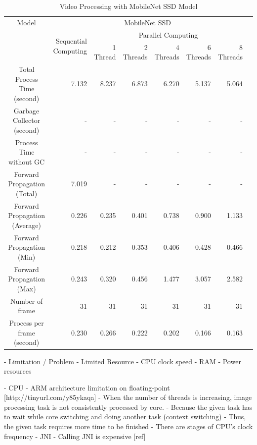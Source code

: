         \begin{table}[!htp]\centering
            \scriptsize
            \begin{tabular}{lrrrrrrrr}\toprule
                \multicolumn{2}{c}{Model} &\multicolumn{6}{c}{MobileNet SSD} \\\cmidrule{1-8}
                \multicolumn{2}{c}{\multirow{2}{*}{}} &\multirow{2}{*}{Sequential Computing} &\multicolumn{5}{c}{Parallel Computing} \\\cmidrule{4-8}
                & & &1 Thread &2 Threads &4 Threads &6 Threads &8 Threads \\\midrule
                \multicolumn{2}{c}{Total Process Time (second)} &7.132 &8.237 &6.873 &6.270 &5.137 &5.064 \\
                \multicolumn{2}{c}{Garbage Collector (second)} &- &- &- &- &- &- \\
                \multicolumn{2}{c}{Process Time without GC} &- &- &- &- &- &- \\
                \multicolumn{2}{c}{Forward Propagation (Total)} &7.019 &- &- &- &- &- \\
                \multicolumn{2}{c}{Forward Propagation (Average)} &0.226 &0.235 &0.401 &0.738 &0.900 &1.133 \\
                \multicolumn{2}{c}{Forward Propagation (Min)} &0.218 &0.212 &0.353 &0.406 &0.428 &0.466 \\
                \multicolumn{2}{c}{Forward Propagation (Max)} &0.243 &0.320 &0.456 &1.477 &3.057 &2.582 \\
                \multicolumn{2}{c}{Number of frame} &31 &31 &31 &31 &31 &31 \\
                \multicolumn{2}{c}{Process per frame (second)} &0.230 &0.266 &0.222 &0.202 &0.166 &0.163 \\
                \bottomrule
            \end{tabular}

            \caption{Video Processing with MobileNet SSD Model}\label{ssd:performance}
        \end{table}

        -	Limitation / Problem
            - Limited Resource
                - CPU clock speed
                - RAM
                - Power resources

            - CPU
                - ARM architecture limitation on floating-point [http://tinyurl.com/y85ykaqa]
                - When the number of threads is increasing, image processing task is not consistently processed by core.
                    - Because the given task has to wait while core switching and doing another task (context switching)
                    - Thus, the given task requires more time to be finished
                - There are stages of CPU's clock frequency
            - JNI
                - Calling JNI is expensive [ref]

